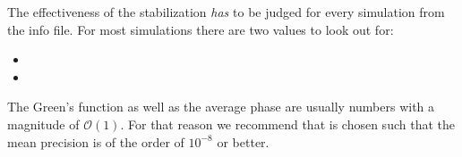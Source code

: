 The effectiveness of the stabilization \emph{has} to be judged for every simulation from the info
file. For most simulations there are two values to look out for:
\begin{itemize}
\item {}
\item {}
\end{itemize}
The Green's function as well as the average phase are usually numbers with a magnitude of $\mathcal{O} (1)$. 
For that reason we recommend that  is chosen such that the mean precision is  of the order of $10^{-8}$  or better.  
